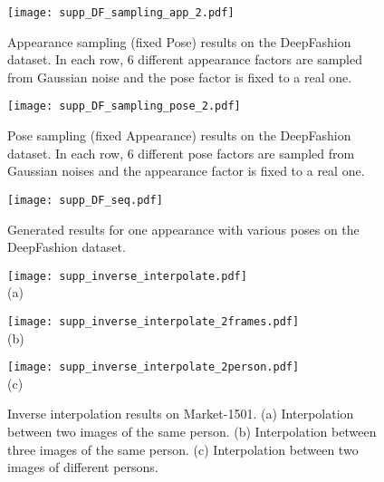 \documentclass[10pt,twocolumn,letterpaper]{article}
\begin{document}
\begin{figure*} [htp]
\scriptsize
  \centering
  \texttt{[image: supp\_DF\_sampling\_app\_2.pdf]}\\
  \caption{Appearance sampling (fixed Pose) results on the DeepFashion dataset. In each row, 6 different appearance factors are sampled from Gaussian noise and the pose factor is fixed to a real one.
  }
\label{fig:supp_DF_samplingApp}
\end{figure*}

\begin{figure*} [htp]
\scriptsize
  \centering
  \texttt{[image: supp\_DF\_sampling\_pose\_2.pdf]}\\
  \caption{Pose sampling (fixed Appearance) results on the DeepFashion dataset. In each row, 6 different pose factors are sampled from Gaussian noises and the appearance factor is fixed to a real one.}
\label{fig:supp_DF_samplingPose}
\end{figure*}

\begin{figure*} [htp]
\scriptsize
  \centering
  \texttt{[image: supp\_DF\_seq.pdf]}\\
  \caption{Generated results for one appearance with various poses on the DeepFashion dataset.}
\label{fig:supp_DF_seq}
\end{figure*}

\begin{figure*} [htp]
\scriptsize
\centering
\begin{minipage}{0.95\textwidth}
\hspace{-0.2cm}
  \centering
  \texttt{[image: supp\_inverse\_interpolate.pdf]}\\
(a)
\end{minipage}
\hfill
\begin{minipage}{0.95\textwidth}
  \centering
  \texttt{[image: supp\_inverse\_interpolate\_2frames.pdf]}\\
(b)
\end{minipage}
\hfill
\begin{minipage}{0.95\textwidth}
  \centering
  \texttt{[image: supp\_inverse\_interpolate\_2person.pdf]}\\
(c)
\end{minipage}
\vspace{-0.2cm}
  \caption{Inverse interpolation results on Market-1501. (a) Interpolation between two images of the same person. (b) Interpolation between three images of the same person. (c) Interpolation between two images of different persons. }
\label{fig:Paper_interpolate_supp}
\end{figure*}
\end{document}
